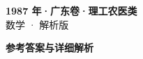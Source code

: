 \documentclass[zihao=-4, a4paper]{ctexart}
\begin{document}
\begin{center}
  {\Large\bfseries 1987 年·广东卷·理工农医类}\\[4pt]
  {\large 数学 · 解析版}
\end{center}
\medskip
{}

\clearpage
{}
\begin{center}{\Large\bfseries 参考答案与详细解析}\end{center}
\medskip

\end{document}
